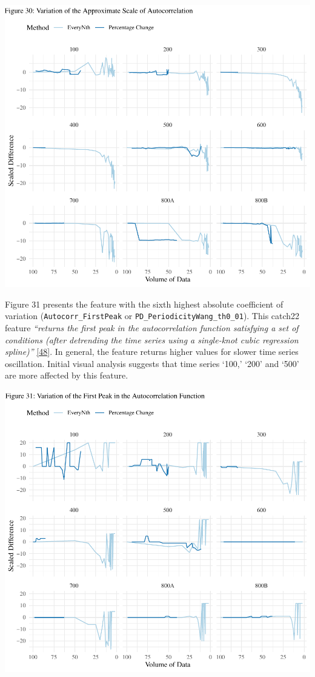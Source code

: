 \documentclass{article}
\begin{document}
\includegraphics{210431461_CSC8639_Dissertation_files/figure-latex/ApproxScale-1.pdf}

\newpage

Figure 31 presents the feature with the sixth highest absolute
coefficient of variation (\texttt{Autocorr\_FirstPeak} or
\texttt{PD\_PeriodicityWang\_th0\_01}). This catch22 feature
\emph{``returns the first peak in the autocorrelation function
satisfying a set of conditions (after detrending the time series using a
single-knot cubic regression spline)''}
\protect\hyperlink{ref-feature_book}{{[}48{]}}. In general, the feature
returns higher values for slower time series oscillation. Initial visual
analysis suggests that time series `100,' `200' and `500' are more
affected by this feature.

\includegraphics{210431461_CSC8639_Dissertation_files/figure-latex/FirstPeak-1.pdf}
\end{document}
